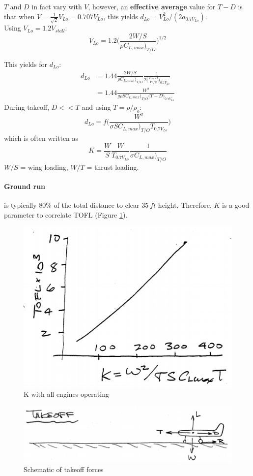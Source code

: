 \documentclass[draft=false, titlepage]{article}
\begin{document}
$T$ and $D$ in fact vary with $V$, however, an \textbf{effective average} value for $T-D$ is that when $V=\frac{1}{\sqrt{2}}V_{Lo} = 0.707 V_{Lo}$, this yields $d_{Lo} = V_{Lo}^2/(2a_{0.7V_{Lo}})$.\\
Using $V_{Lo} = 1.2 V_{stall}$:
\begin{equation}
V_{Lo} = 1.2 \Big(\frac{2W/S}{\rho C_{L,max}\big)_{T/O}}\Big)^{1/2}
\end{equation}

This yields for $d_{Lo}$:
\begin{align*}
d_{Lo} &= 1.44 \frac{2W/S}{\rho C_{L,max}\big)_{T/O}}\frac{1}{2\Big( \frac{T-D}{W/g} \Big)_{0.7V_{Lo}}}\\
&= 1.44 \frac{W^2}{ g\rho SC_{L,max}\big)_{T/O} \big(T-D\big)_{0.7V_{Lo}} }
\end{align*}
During takeoff, $D<<T$ and using $T=\rho/\rho_o$:
\begin{equation*}
d_{Lo} = f\Big(\frac{W^2}{ \sigma S C_{L,max}\big)_{T/O} T_{0.7V_{Lo}} }\Big)
\end{equation*}
which is often written as
\begin{equation*}
K = \frac{W}{S} \frac{W}{T_{0.7V_{Lo}}} \frac{1}{\sigma C_{L,max}\big)_{T/O}}
\end{equation*}
$W/S$ = wing loading, $W/T$ = thrust loading.
\paragraph*{Ground run} is typically 80\% of the total distance to clear $35\ ft$ height. Therefore, $K$ is a good parameter to correlate TOFL (Figure \ref{fig:p98_KParameter}).

\begin{figure}[ht]
	\centering
	\includegraphics[width=0.5\linewidth]{Figures/p98_KParameter.PNG}
	\caption{K with all engines operating}
	\label{fig:p98_KParameter}
\end{figure}
\begin{figure}[ht]
	\centering
	\includegraphics[width=0.9\linewidth]{Figures/p99_takeoff.PNG}
	\caption{Schematic of takeoff forces}
	\label{fig:p99_takeoff}
\end{figure}
\end{document}
